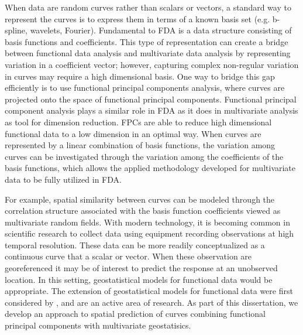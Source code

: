 When data are random curves rather than scalars or vectors, a standard way to represent the curves is to express them in terms of a known basis set (e.g. b-spline, wavelets, Fourier). Fundamental to FDA is a data structure consisting of basis functions and coefficients. This type of representation can create a bridge between functional data analysis and multivariate data analysis by representing variation in a coefficient vector; however, capturing complex non-regular variation in curves may require a high dimensional basis. One way to bridge this gap efficiently is to use functional principal components analysis, where curves are projected onto the space of functional principal components. Functional principal component analysis plays a similar role in FDA as it does in multivariate analysis as tool for dimension reduction. FPCs are able to reduce high dimensional functional data to a low dimension in an optimal way. When curves are represented by a linear combination of basis functions, the variation among curves can be investigated through the variation among the coefficients of the basis functions, which allows the applied methodology developed for multivariate data to be fully utilized in FDA.

For example, spatial similarity between curves can be modeled through the correlation structure associated with the basis function coefficients viewed as multivariate random fields. With modern technology, it is becoming common in scientific research to collect data using equipment recording observations at high temporal resolution. These data can be more readily conceptualized as a continuous curve that a scalar or vector. When these observation are georeferenced it may be of interest to predict the response at an unobserved location. In this setting, geostatistical models for functional data would be appropriate. The extension of geostatistical models for functional data were first considered by \cite{Goulard:1993}, and are an active area of research. As part of this dissertation, we develop an approach to spatial prediction of curves combining functional principal components with multivariate geostatisics. 
 
